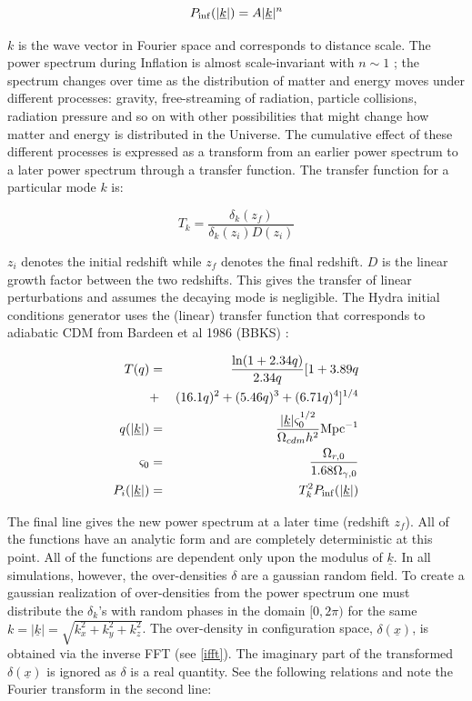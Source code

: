 \begin{equation}
P_{\rm inf}(|\underline{k}|) = A |\underline{k}|^n
\end{equation}

\noindent $k$ is the wave vector in Fourier space and corresponds to distance scale. The power spectrum during Inflation is almost scale-invariant with $n\sim 1$ \citep{bib_baum}; the spectrum changes over time as the distribution of matter and energy moves under different processes: gravity, free-streaming of radiation, particle collisions, radiation pressure and so on with other possibilities that might change how matter and energy is distributed in the Universe. The cumulative effect of these different processes is expressed as a transform from an earlier power spectrum to a later power spectrum through a transfer function. The transfer function for a particular mode $k$ is:

\begin{equation}
T_k = \frac{\delta_k(z_f)}{\delta_k(z_i) D(z_i)}
\end{equation}

\noindent $z_i$ denotes the initial redshift while $z_f$ denotes the final redshift. $D$ is the linear growth factor between the two redshifts. This gives the transfer of linear perturbations and assumes the decaying mode is negligible. The Hydra initial conditions generator uses the (linear) transfer function that corresponds to adiabatic CDM from Bardeen et al 1986 (BBKS) \citep{bib_bar}:

\begin{eqnarray}
T(q) &=& \frac{\ln(1+2.34q)}{2.34q}[1+ 3.89q \nonumber \\
	&+& (16.1q)^2 + (5.46q)^3 + (6.71q)^4]^{1/4} \\
q(|\underline{k}|) &=& \frac{|\underline{k}| \varsigma^{1/2}_0 }{\Omega_{cdm} h^2} \rm{Mpc^{-1}} \\
\varsigma_0 &=& \frac{\Omega_{r,0}}{1.68\Omega_{\gamma,0}} \\
P_i(|\underline{k}|) &=& T_k^2 P_{\rm inf}(|\underline{k}|)
\end{eqnarray}

\noindent The final line gives the new power spectrum at a later time (redshift $z_f$). All of the functions have an analytic form and are completely deterministic at this point. All of the functions are dependent only upon the modulus of $\underline{k}$. In all simulations, however, the over-densities $\delta$ are a gaussian random field. To create a gaussian realization of over-densities from the power spectrum one must distribute the $\delta_{k}$'s with random phases in the domain $[0,2\pi)$ for the same $k=|\underline{k}|=\sqrt{k_x^2+k_y^2+k_z^2}$. The over-density in configuration space, $\delta(\underline{x})$, is obtained via the inverse FFT (see \ref{ifft}). The imaginary part of the transformed $\delta (\underline{x})$ is ignored as $\delta$ is a real quantity. See the following relations and note the Fourier transform in the second line:

